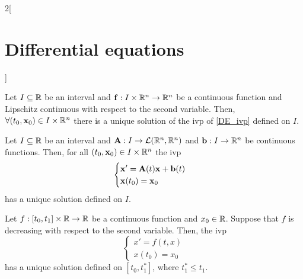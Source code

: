 \documentclass[../../../main.tex]{subfiles}
\begin{document}
\begin{multicols}{2}[\section{Differential equations}]
\begin{corollary}
  \end{corollary}
  \begin{proposition}
    Let $I\subseteq\mathbb{R}$ be an interval and $\boldsymbol{\mathrm{f}}:I\times\mathbb{R}^n\rightarrow\mathbb{R}^n$ be a continuous function and Lipschitz continuous with respect to the second variable. Then, $\forall(t_0,\boldsymbol{\mathrm{x}}_0)\in I\times\mathbb{R}^n$ there is a unique solution of the ivp of \cref{DE_ivp} defined on $I$.
  \end{proposition}
  \begin{corollary}
    Let $I\subseteq\mathbb{R}$ be an interval and $\boldsymbol{\mathrm{A}}:I\rightarrow\mathcal{L}(\mathbb{R}^n,\mathbb{R}^n)$ and $\boldsymbol{\mathrm{b}}:I\rightarrow\mathbb{R}^n$ be continuous functions. Then, for all $(t_0,\boldsymbol{\mathrm{x}}_0)\in I\times\mathbb{R}^n$ the ivp
    $$
      \begin{cases}
        \boldsymbol{\mathrm{x}}'=\boldsymbol{\mathrm{A}}(t)\boldsymbol{\mathrm{x}}+\boldsymbol{\mathrm{b}}(t) \\
        \boldsymbol{\mathrm{x}}(t_0)=\boldsymbol{\mathrm{x}}_0
      \end{cases}
    $$
    has a unique solution defined on $I$.
  \end{corollary}
  \begin{theorem}
    Let $f:[t_0,t_1]\times\mathbb{R}\rightarrow\mathbb{R}$ be a continuous function and $x_0\in \mathbb{R}$. Suppose that $f$ is decreasing with respect to the second variable. Then, the ivp
    \begin{equation*}
      \begin{cases}
        x'=f(t,x) \\
        x(t_0)=x_0
      \end{cases}
    \end{equation*}
    has a unique solution defined on $[t_0,t_1^*]$, where $t_1^*\leq t_1$.
  \end{theorem}

\end{multicols}
\end{document}
